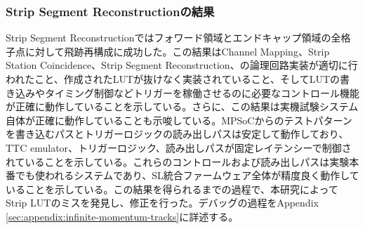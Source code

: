 \subsubsection*{Strip Segment Reconstructionの結果}
Strip Segment Reconstructionではフォワード領域とエンドキャップ領域の全格子点に対して飛跡再構成に成功した。この結果はChannel Mapping、Strip Station Coincidence、Strip Segment Reconstruction、の論理回路実装が適切に行われたこと、作成されたLUTが抜けなく実装されていること、そしてLUTの書き込みやタイミング制御などトリガーを稼働させるのに必要なコントロール機能が正確に動作していることを示している。さらに、この結果は実機試験システム自体が正確に動作していることも示唆している。MPSoCからのテストパターンを書き込むパスとトリガーロジックの読み出しパスは安定して動作しており、TTC emulator、トリガーロジック、読み出しパスが固定レイテンシーで制御されていることを示している。これらのコントロールおよび読み出しパスは実験本番でも使われるシステムであり、SL統合ファームウェア全体が精度良く動作していることを示している。この結果を得られるまでの過程で、本研究によって
Strip LUTのミスを発見し、修正を行った。デバッグの過程をAppendix \ref{sec:appendix:infinite-momentum-tracks}に詳述する。

